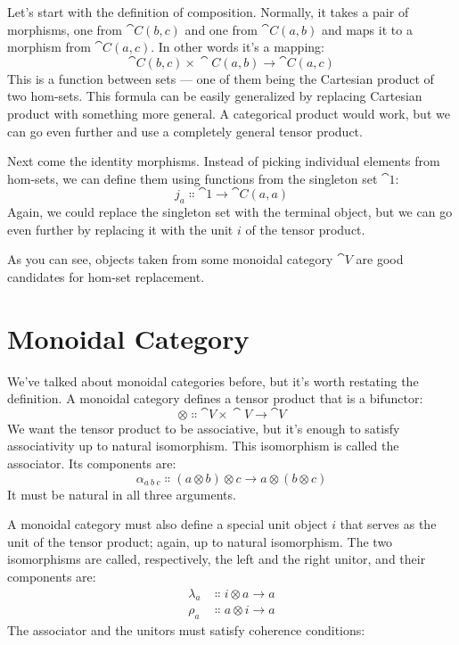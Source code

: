 Let's start with the definition of composition. Normally, it takes a
pair of morphisms, one from $\cat{C}(b, c)$ and one from
$\cat{C}(a, b)$ and maps it to a morphism from $\cat{C}(a, c)$. In
other words it's a mapping:
\[\cat{C}(b, c)\times{}\cat{C}(a, b) \to \cat{C}(a, c)\]
This is a function between sets --- one of them being the Cartesian
product of two hom-sets. This formula can be easily generalized by
replacing Cartesian product with something more general. A categorical
product would work, but we can go even further and use a completely
general tensor product.

Next come the identity morphisms. Instead of picking individual elements
from hom-sets, we can define them using functions from the singleton set
$\cat{1}$:
\[j_a \Colon \cat{1} \to \cat{C}(a, a)\]
Again, we could replace the singleton set with the terminal object, but
we can go even further by replacing it with the unit $i$ of the
tensor product.

As you can see, objects taken from some monoidal category $\cat{V}$ are
good candidates for hom-set replacement.

\section{Monoidal Category}

We've talked about monoidal categories before, but it's worth restating
the definition. A monoidal category defines a tensor product that is a
bifunctor:
\[\otimes \Colon \cat{V}\times{}\cat{V} \to \cat{V}\]
We want the tensor product to be associative, but it's enough to satisfy
associativity up to natural isomorphism. This isomorphism is called the
associator. Its components are:
\[\alpha_{a\ b\ c} \Colon (a \otimes b) \otimes c \to a \otimes (b \otimes c)\]
It must be natural in all three arguments.

A monoidal category must also define a special unit object $i$
that serves as the unit of the tensor product; again, up to natural
isomorphism. The two isomorphisms are called, respectively, the left and
the right unitor, and their components are:
\begin{align*}
\lambda_a &\Colon i \otimes a \to a \\
\rho_a &\Colon a \otimes i \to a
\end{align*}
The associator and the unitors must satisfy coherence conditions:

\begin{figure}[H]
\centering
{}
\end{figure}

